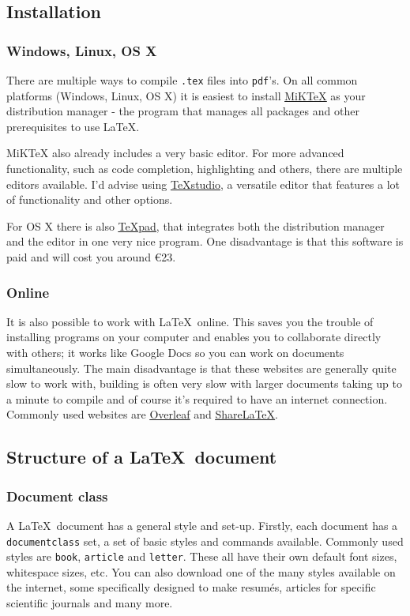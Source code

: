 \documentclass[a4paper,10pt]{article}
\begin{document}
\subsection{Installation}
\subsubsection{Windows, Linux, OS X}
There are multiple ways to compile {\tt .tex} files into {\tt pdf}'s. On all common platforms (Windows, Linux, OS X) it is easiest to install \underline{\href{https://miktex.org/download}{MiKTeX}} as your distribution manager - the program that manages all packages and other prerequisites to use \LaTeX.

MiKTeX also already includes a very basic editor. For more advanced functionality, such as code completion, highlighting and others, there are multiple editors available. I'd advise using \underline{\href{https://www.texstudio.org/}{TeXstudio}}, a versatile editor that features a lot of functionality and other options.

For OS X there is also \underline{\href{https://www.texpad.com/}{TeXpad}}, that integrates both the distribution manager and the editor in one very nice program. One disadvantage is that this software is paid and will cost you around \euro 23.

\subsubsection{Online}
It is also possible to work with \LaTeX\ online. This saves you the trouble of installing programs on your computer and enables you to collaborate directly with others; it works like Google Docs so you can work on documents simultaneously. The main disadvantage is that these websites are generally quite slow to work with, building is often very slow with larger documents taking up to a minute to compile and of course it's required to have an internet connection. Commonly used websites are \underline{\href{https://www.overleaf.com/}{Overleaf}} and \underline{\href{https://www.sharelatex.com/}{ShareLaTeX}}.

\subsection{Structure of a \LaTeX\ document}
\subsubsection{Document class}
A \LaTeX\ document has a general style and set-up. Firstly, each document has a {\tt documentclass} set, a set of basic styles and commands available. Commonly used styles are {\tt book}, {\tt article} and {\tt letter}. These all have their own default font sizes, whitespace sizes, etc. You can also download one of the many styles available on the internet, some specifically designed to make resum\'es, articles for specific scientific journals and many more.
\end{document}
